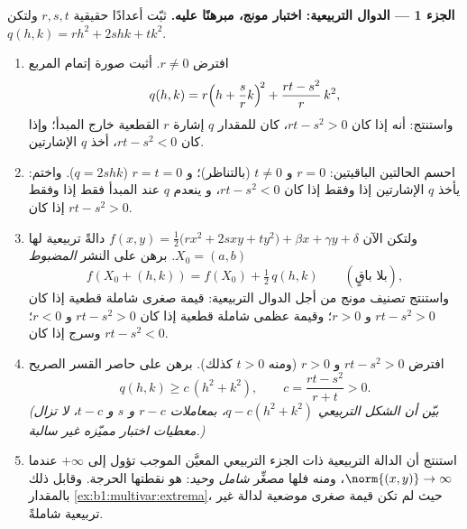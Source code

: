 \begin{problem}
\medskip
\noindent\textbf{الجزء 1 --- الدوال التربيعية: اختبار مونج،
مبرهنًا عليه.} ثبّت أعدادًا حقيقية $r, s, t$ ولتكن $q(h, k) = r h^2 + 2s hk +
t k^2$.
\begin{enumerate}
  \item افترض $r \neq 0$. أثبت صورة إتمام المربع
        \[
        q(h, k) = r\Bigl(h + \frac{s}{r}k\Bigr)^{\!2}
        + \frac{rt - s^2}{r}\,k^2 ,
        \]
        واستنتج: أنه إذا كان $rt - s^2 > 0$، كان للمقدار $q$ إشارة $r$
        القطعية خارج المبدأ؛ وإذا كان $rt - s^2 < 0$، أخذ $q$
        الإشارتين.
  \item احسم الحالتين الباقيتين: $r = 0$ و $t \neq 0$
        (بالتناظر)؛ و $r = t = 0$ ($q = 2shk$). واختم:
        يأخذ $q$ الإشارتين إذا وفقط إذا كان $rt - s^2 < 0$، و
        ينعدم $q$ عند المبدأ فقط إذا وفقط إذا كان $rt - s^2 > 0$.
  \item ولتكن الآن $f(x, y) = \frac12\bigl(r x^2 + 2s xy + t
        y^2\bigr) + \beta x + \gamma y + \delta$ دالةً تربيعية
        لها  $X_0 = (a, b)$. برهن على النشر
        \emph{المضبوط}
        \[
        f(X_0 + (h,k)) = f(X_0) + \tfrac12\,q(h, k)
        \qquad (\text{بلا باقٍ}),
        \]
        واستنتج تصنيف مونج من أجل الدوال
        التربيعية: قيمة صغرى شاملة قطعية إذا كان $rt - s^2 > 0$ و $r >
        0$؛ وقيمة عظمى شاملة قطعية إذا كان $rt - s^2 > 0$ و $r < 0$؛
        وسرج إذا كان $rt - s^2 < 0$.
  \item افترض $rt - s^2 > 0$ و $r > 0$ (ومنه $t > 0$ كذلك).
        برهن على حاصر القسر الصريح
        \[
        q(h, k) \geq c\,(h^2 + k^2),
        \qquad
        c = \frac{rt - s^2}{r + t} > 0 .
        \]
        \emph{(بيّن أن الشكل التربيعي $q - c(h^2 + k^2)$،
        بمعاملات $r - c$ و $s$ و $t - c$، لا تزال معطيات
        اختبار مميّزه غير سالبة.)}
  \item استنتج أن الدالة التربيعية ذات الجزء التربيعي المعيَّن
        الموجب تؤول إلى $+\infty$ عندما $\norm{(x,y)} \to
        \infty$، ومنه فلها مصغِّر \emph{شامل وحيد}: هو
        نقطتها الحرجة. وقابل ذلك
        بالمقدار \cref{ex:b1:multivar:extrema}، حيث لم تكن قيمة صغرى موضعية
        لدالة غير تربيعية شاملةً.
\end{enumerate}


\end{problem}
